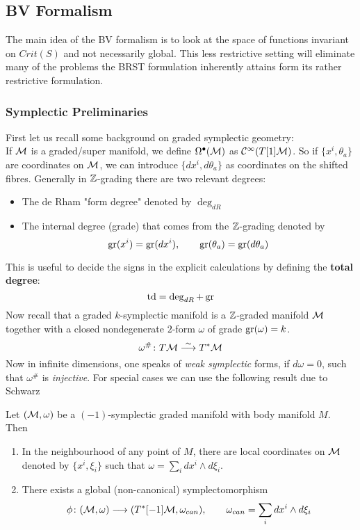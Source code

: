\subsection{BV Formalism}
\label{subsec:BVFormalism}

The main idea of the BV formalism is to look at the space of functions invariant on $Crit(S)$ and not necessarily global. This less restrictive setting will eliminate many of the problems the BRST formulation inherently attains form its rather restrictive formulation.

\subsubsection{Symplectic Preliminaries}
First let us recall some background on graded symplectic geometry:\\
If $\mathcal{M}$ is a graded/super manifold, we define $\Omega^\bullet(\mathcal{M})$ as $\mathcal{C}^{\infty}(T[1]\mathcal{M})$. So if $\{x^i, \theta_a\}$ are coordinates on $\mathcal{M}$, we can introduce $\{dx^i, d\theta_a\}$ as coordinates on the shifted fibres. Generally in $\mathbb{Z}$-grading there are two relevant degrees:
\begin{itemize}
  \item The de Rham "form degree" denoted by $\deg_{dR}$
  \item The internal degree (grade) that comes from the $\mathbb{Z}$-grading denoted by
  $$ \operatorname{gr}(x^i) = \operatorname{gr}(dx^i), \quad \quad \operatorname{gr}(\theta_a) = \operatorname{gr}(d\theta_a) $$
\end{itemize}
This is useful to decide the signs in the explicit calculations by defining the \textbf{total degree}:
\begin{equation}
  \operatorname{td} = \deg_{dR} + \operatorname{gr}
\end{equation}
Now recall that a graded $k$-symplectic manifold is a $\mathbb{Z}$-graded manifold $\mathcal{M}$ together with a closed nondegenerate $2$-form $\omega$ of grade $\operatorname{gr}(\omega) = k$.
\begin{equation}
  \omega^\# \colon T\mathcal{M} \overset{\sim}{\longrightarrow} T^* \mathcal{M}
\end{equation}
Now in infinite dimensions, one speaks of \emph{weak symplectic} forms, if $d \omega = 0$, such that $\omega^\#$ is \emph{injective}. For special cases we can use the following result due to Schwarz

\begin{theo}[Schwarz]
  Let $(\mathcal{M}, \omega)$ be a $(-1)$-symplectic graded manifold with body manifold $M$. Then
  \begin{enumerate}
    \item In the neighbourhood of any point of $M$, there are local coordinates on $\mathcal{M}$ denoted by $\{x^i, \xi_i\}$ such that $\omega = \sum_i dx^i \wedge d\xi_i$.

    \item There exists a global (non-canonical) symplectomorphism
    \begin{equation}
      \phi \colon (\MM, \omega) \lra (T^*[-1]\MM, \omega_{can}), \quad \quad \omega_{can} = \sum_i dx^i \wedge d\xi_i
    \end{equation}
  \end{enumerate}
\end{theo}

